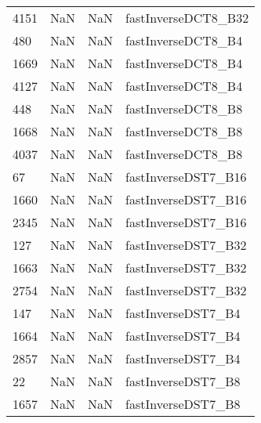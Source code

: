 \begin{tabular}{llll}
4151 &                   NaN &                        NaN &                       fastInverseDCT8\_B32 \\
480  &                   NaN &                        NaN &                        fastInverseDCT8\_B4 \\
1669 &                   NaN &                        NaN &                        fastInverseDCT8\_B4 \\
4127 &                   NaN &                        NaN &                        fastInverseDCT8\_B4 \\
448  &                   NaN &                        NaN &                        fastInverseDCT8\_B8 \\
1668 &                   NaN &                        NaN &                        fastInverseDCT8\_B8 \\
4037 &                   NaN &                        NaN &                        fastInverseDCT8\_B8 \\
67   &                   NaN &                        NaN &                       fastInverseDST7\_B16 \\
1660 &                   NaN &                        NaN &                       fastInverseDST7\_B16 \\
2345 &                   NaN &                        NaN &                       fastInverseDST7\_B16 \\
127  &                   NaN &                        NaN &                       fastInverseDST7\_B32 \\
1663 &                   NaN &                        NaN &                       fastInverseDST7\_B32 \\
2754 &                   NaN &                        NaN &                       fastInverseDST7\_B32 \\
147  &                   NaN &                        NaN &                        fastInverseDST7\_B4 \\
1664 &                   NaN &                        NaN &                        fastInverseDST7\_B4 \\
2857 &                   NaN &                        NaN &                        fastInverseDST7\_B4 \\
22   &                   NaN &                        NaN &                        fastInverseDST7\_B8 \\
1657 &                   NaN &                        NaN &                        fastInverseDST7\_B8 \\

\end{tabular}
